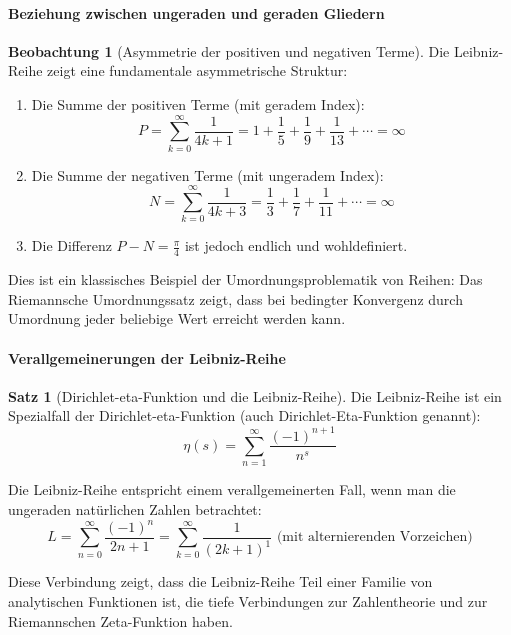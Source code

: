 \documentclass[a4paper, 12pt, twoside, openright]{report}
\theoremstyle{definition}
\newtheorem{beobachtung}{Beobachtung}
\theoremstyle{definition}
\newtheorem{satz}{Satz}[chapter]
\begin{document}
\paragraph{Beziehung zwischen ungeraden und geraden Gliedern}

\begin{beobachtung}[Asymmetrie der positiven und negativen Terme]
Die Leibniz-Reihe zeigt eine fundamentale asymmetrische Struktur:
\begin{enumerate}
\item Die Summe der positiven Terme (mit geradem Index):
\begin{equation}
P = \sum_{k=0}^{\infty} \frac{1}{4k+1} = 1 + \frac{1}{5} + \frac{1}{9} + \frac{1}{13} + \cdots = \infty
\end{equation}

\item Die Summe der negativen Terme (mit ungeradem Index):
\begin{equation}
N = \sum_{k=0}^{\infty} \frac{1}{4k+3} = \frac{1}{3} + \frac{1}{7} + \frac{1}{11} + \cdots = \infty
\end{equation}

\item Die Differenz $P - N = \frac{\pi}{4}$ ist jedoch endlich und wohldefiniert.
\end{enumerate}

Dies ist ein klassisches Beispiel der Umordnungsproblematik von Reihen: Das Riemannsche Umordnungssatz zeigt, dass bei bedingter Konvergenz durch Umordnung jeder beliebige Wert erreicht werden kann.
\end{beobachtung}

\paragraph{Verallgemeinerungen der Leibniz-Reihe}

\begin{satz}[Dirichlet-eta-Funktion und die Leibniz-Reihe]
Die Leibniz-Reihe ist ein Spezialfall der Dirichlet-eta-Funktion (auch Dirichlet-Eta-Funktion genannt):
\begin{equation}
\eta(s) = \sum_{n=1}^{\infty} \frac{(-1)^{n+1}}{n^s}
\end{equation}

Die Leibniz-Reihe entspricht einem verallgemeinerten Fall, wenn man die ungeraden natürlichen Zahlen betrachtet:
\begin{equation}
L = \sum_{n=0}^{\infty} \frac{(-1)^n}{2n+1} = \sum_{k=0}^{\infty} \frac{1}{(2k+1)^1} \text{ (mit alternierenden Vorzeichen)}
\end{equation}

Diese Verbindung zeigt, dass die Leibniz-Reihe Teil einer Familie von analytischen Funktionen ist, die tiefe Verbindungen zur Zahlentheorie und zur Riemannschen Zeta-Funktion haben.
\end{satz}
\end{document}
